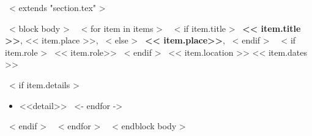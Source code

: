 ~< extends "section.tex" >~

~< block body >~
    ~< for item in items >~
      ~< if item.title >~
      \textbf{<< item.title >>}, << item.place >>,
      ~< else >~
      \textbf{<< item.place>>},
      ~< endif >~
      ~< if item.role >~
      << item.role>>
      ~< endif >~
      << item.location >>
      \hfill << item.dates >> \par
        ~< if item.details >~
          \begin{itemize}
          ~< for detail in item.details ->~
              \item[\textbullet]{<<detail>>}
          ~<- endfor ->~
          \end{itemize}
        ~< endif >~
    ~< endfor >~
~< endblock body >~
